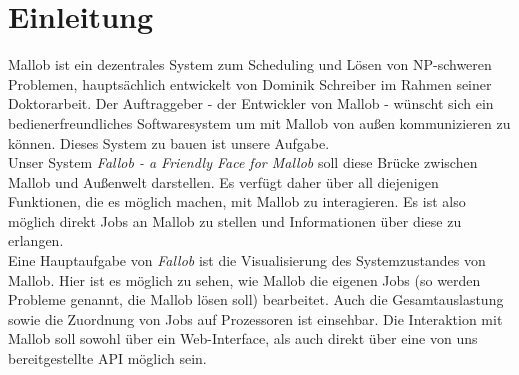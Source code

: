 \section{Einleitung}



Mallob ist ein dezentrales System zum Scheduling und Lösen von NP-schweren Problemen, hauptsächlich entwickelt von Dominik Schreiber im Rahmen seiner Doktorarbeit. Der Auftraggeber - der Entwickler von Mallob - wünscht sich ein bedienerfreundliches Softwaresystem um mit Mallob von außen kommunizieren zu können. Dieses System zu bauen ist unsere Aufgabe.\\
Unser System \textit{Fallob - a Friendly Face for Mallob} soll diese Brücke zwischen Mallob und Außenwelt darstellen.
Es verfügt daher über all diejenigen Funktionen, die es möglich machen, mit Mallob zu interagieren. Es ist also möglich direkt Jobs an Mallob zu stellen und Informationen über diese zu erlangen.\\
Eine Hauptaufgabe von \textit{Fallob} ist die Visualisierung des Systemzustandes von Mallob. Hier ist es möglich zu sehen, wie Mallob die eigenen Jobs (so werden Probleme genannt, die Mallob lösen soll) bearbeitet. Auch die Gesamtauslastung sowie die Zuordnung von Jobs auf Prozessoren ist einsehbar. 
Die Interaktion mit Mallob soll sowohl über ein Web-Interface, als auch direkt über eine von uns bereitgestellte API möglich sein. %




